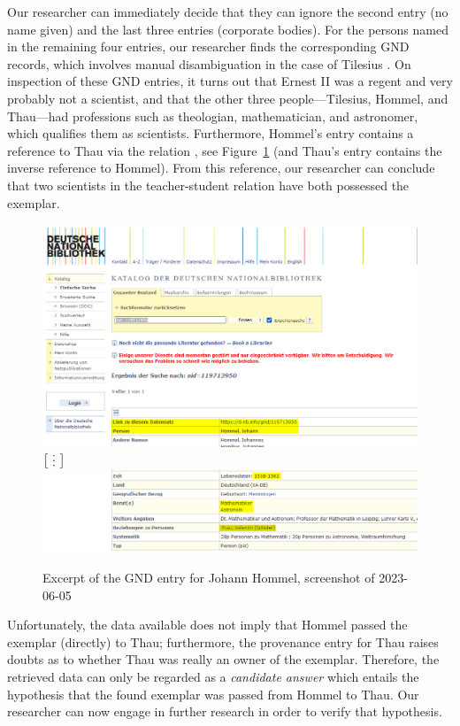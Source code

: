 Our researcher can immediately decide that they can ignore the second entry (no name given) and the last three entries (corporate bodies).
For the persons named in the remaining four entries, our researcher finds the corresponding \gls{GND} records, which involves manual disambiguation in the case of Tilesius
\autocite{GNDTilesius,GNDHommel,GNDThau,GNDErnstII}.
On inspection of these \gls{GND} entries, it turns out that Ernest II was a regent and very probably not a scientist,
and that the other three people---Tilesius, Hommel, and Thau---had professions such as theologian,
mathematician, and astronomer, which qualifies them as scientists. Furthermore, Hommel's entry
contains a reference to Thau via the relation , see Figure~\ref{fig:GND_Hommel}
(and Thau's entry contains the inverse reference to Hommel).
From this reference, our researcher can conclude that two scientists in the teacher-student relation
have both possessed the exemplar. 

\begin{figure}[ht]
  \centering
  \includegraphics[width=.7\linewidth,trim=140 0 150 380,clip]{img/gnd_hommel_1.png} \\
  $\big[\raisebox{-1.8pt}{\rvdots}\big]$ \\
  \includegraphics[width=.7\linewidth,trim=140 0 150 0,clip]{img/gnd_hommel_2.png}
  \caption{Excerpt of the GND entry for Johann Hommel, screenshot of 2023-06-05}
  \label{fig:GND_Hommel}
\end{figure}

Unfortunately, the data available does not imply that Hommel passed the exemplar (directly) to Thau;
furthermore, the provenance entry for Thau raises doubts as to whether Thau was really an owner of the exemplar.
Therefore, the retrieved data can only be regarded as a \emph{candidate answer}
which entails the hypothesis that the found exemplar was passed from Hommel to Thau.
Our researcher can now engage in further research in order to verify that hypothesis.

